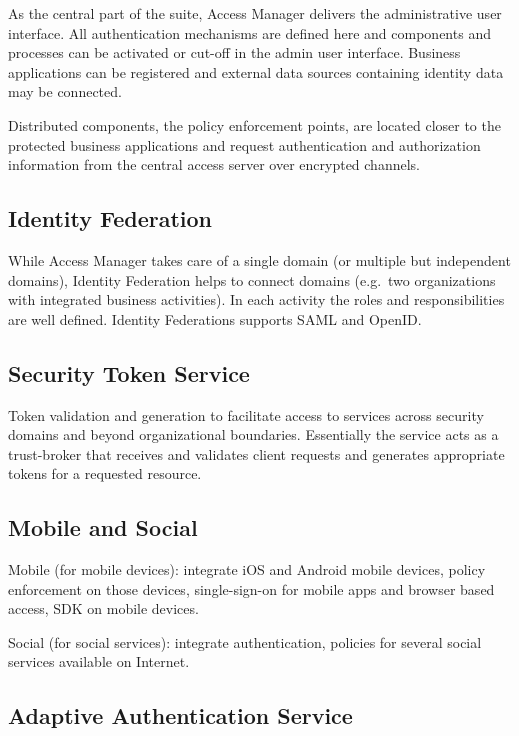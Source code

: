 As the central part of the suite, Access Manager delivers the
administrative user interface. All authentication mechanisms are defined
here and components and processes can be activated or cut-off in the
admin user interface. Business applications can be registered and
external data sources containing identity data may be connected.

Distributed components, the policy enforcement points, are located
closer to the protected business applications and request authentication
and authorization information from the central access server over
encrypted channels.


\subsection{Identity Federation}

While Access Manager takes care of a single domain (or multiple but
independent domains), Identity Federation helps to connect domains
(e.g.\ two organizations with integrated business activities).  In each
activity the roles and responsibilities are well defined. Identity
Federations supports SAML and OpenID\@.


\subsection{Security Token Service}

Token validation and generation to facilitate access to services across
security domains and beyond organizational boundaries. Essentially the
service acts as a trust-broker that receives and validates client
requests and generates appropriate tokens for a requested resource.


\subsection{Mobile and Social}

Mobile (for mobile devices): integrate iOS and Android mobile devices,
policy enforcement on those devices, single-sign-on for mobile apps and
browser based access, SDK on mobile devices.

Social (for social services): integrate authentication, policies for
several social services available on Internet.


\subsection{Adaptive Authentication Service}

